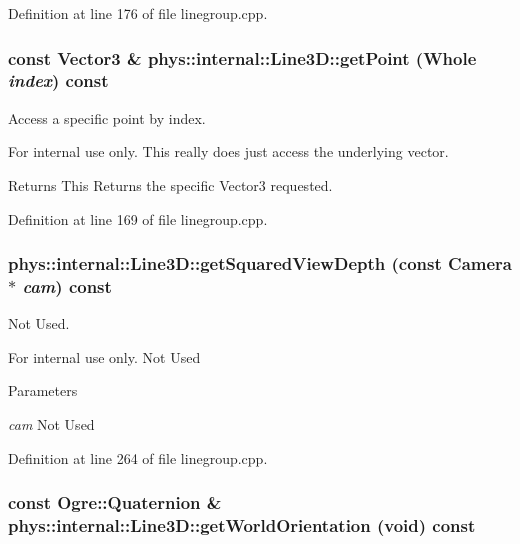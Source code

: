 Definition at line 176 of file linegroup.cpp.

\hypertarget{classphys_1_1internal_1_1Line3D_a190af0e38be28297ed2f6a7aecf0c316}{
\subsubsection[{getPoint}]{\setlength{\rightskip}{0pt plus 5cm}const Vector3 \& phys::internal::Line3D::getPoint ({\bf Whole} {\em index}) const}}
\label{d4/db5/classphys_1_1internal_1_1Line3D_a190af0e38be28297ed2f6a7aecf0c316}


Access a specific point by index. 

\begin{DoxyInternal}{For internal use only.}
This really does just access the underlying vector. \begin{DoxyReturn}{Returns}
This Returns the specific Vector3 requested. 
\end{DoxyReturn}
\end{DoxyInternal}


Definition at line 169 of file linegroup.cpp.

\hypertarget{classphys_1_1internal_1_1Line3D_a04b77721c599bb368c791da7621fc814}{
\subsubsection[{getSquaredViewDepth}]{ phys::internal::Line3D::getSquaredViewDepth (const Camera $\ast$ {\em cam}) const}}
\label{d4/db5/classphys_1_1internal_1_1Line3D_a04b77721c599bb368c791da7621fc814}


Not Used. 

\begin{DoxyInternal}{For internal use only.}
Not Used 
\begin{DoxyParams}{Parameters}
\item[{\em cam}]Not Used \end{DoxyParams}
\end{DoxyInternal}


Definition at line 264 of file linegroup.cpp.

\hypertarget{classphys_1_1internal_1_1Line3D_a68aea39fc0eee3eeb744c5cd151ef209}{
\subsubsection[{getWorldOrientation}]{\setlength{\rightskip}{0pt plus 5cm}const Ogre::Quaternion \& phys::internal::Line3D::getWorldOrientation (void) const}}
\label{d4/db5/classphys_1_1internal_1_1Line3D_a68aea39fc0eee3eeb744c5cd151ef209}



